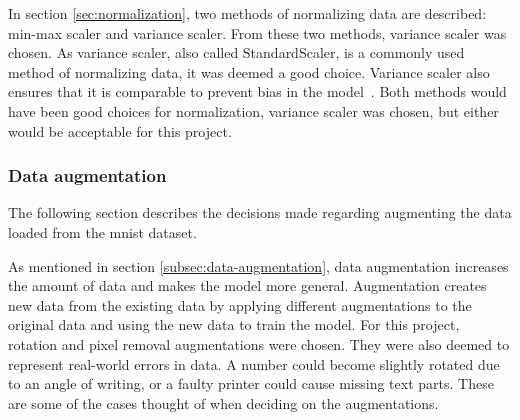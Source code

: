 In section \ref{sec:normalization}, two methods of normalizing data are described: min-max scaler and variance scaler. From these two methods, variance scaler was chosen. As variance scaler, also called StandardScaler, is a commonly used method of normalizing data, it was deemed a good choice. Variance scaler also ensures that it is comparable to prevent bias in the model~\cite{StandardScaler-towardsAi}. Both methods would have been good choices for normalization, variance scaler was chosen, but either would be acceptable for this project.

\subsubsection{Data augmentation}
The following section describes the decisions made regarding augmenting the data loaded from the \gls{mnist} dataset.

As mentioned in section \ref{subsec:data-augmentation}, data augmentation increases the amount of data and makes the model more general. Augmentation creates new data from the existing data by applying different augmentations to the original data and using the new data to train the model. For this project, rotation and pixel removal augmentations were chosen. They were also deemed to represent real-world errors in data. A number could become slightly rotated due to an angle of writing, or a faulty printer could cause missing text parts. These are some of the cases thought of when deciding on the augmentations.



